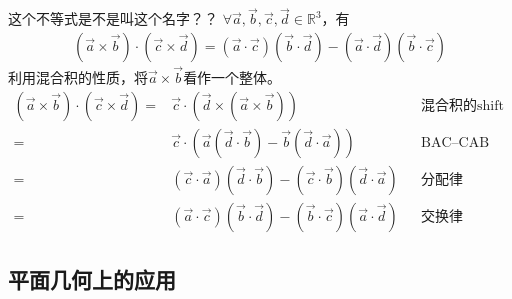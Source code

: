 \begin{example}{\color{red}这个不等式是不是叫这个名字？？}
  $\forall \vec a,\vec b,\vec c,\vec d\in\mathbb{R}^3$，有
  \begin{align*}
    (\vec a\times \vec b) \cdot (\vec c\times \vec d) =
    (\vec a\cdot \vec c)(\vec b\cdot \vec d) - (\vec a\cdot \vec d)(\vec b\cdot \vec c)
  \end{align*}
  利用混合积的性质，将$\vec a\times\vec b$看作一个整体。
  \begin{align*}
    (\vec a\times \vec b) \cdot (\vec c\times \vec d) ={}&
    \vec c \cdot (\vec d\times (\vec a\times \vec b)) &&\text{混合积的shift property}\\
    ={}& \vec c\cdot( \vec a(\vec d\cdot\vec b) -\vec b(\vec d\cdot\vec a) ) && \text{BAC--CAB rule}\\
    ={}& (\vec c\cdot\vec a)(\vec d\cdot\vec b) - (\vec c\cdot\vec b)(\vec d\cdot\vec a) &&\text{分配律}\\
    ={}& (\vec a\cdot\vec c)(\vec b\cdot\vec d) - (\vec b\cdot\vec c)(\vec a\cdot\vec d) &&\text{交换律}
  \end{align*}
\end{example}

\subsection{平面几何上的应用}
\label{sec:application-on-geometry-of-vector}

